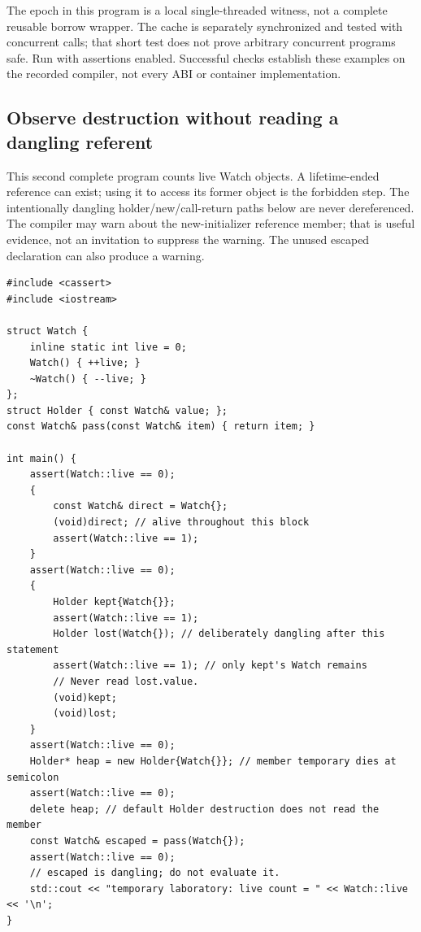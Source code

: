 The epoch in this program is a local single-threaded witness, not a complete reusable borrow wrapper. The cache is separately synchronized and tested with concurrent calls; that short test does not prove arbitrary concurrent programs safe. Run with assertions enabled. Successful checks establish these examples on the recorded compiler, not every ABI or container implementation.

\subsection{Observe destruction without reading a dangling referent}\label{05-engine-i-ch004-observe-destruction-without-reading-a-dangling-referent}

This second complete program counts live Watch objects. A lifetime-ended reference can exist; using it to access its former object is the forbidden step. The intentionally dangling holder/new/call-return paths below are never dereferenced. The compiler may warn about the new-initializer reference member; that is useful evidence, not an invitation to suppress the warning. The unused escaped declaration can also produce a warning.

\begin{verbatim}
#include <cassert>
#include <iostream>

struct Watch {
    inline static int live = 0;
    Watch() { ++live; }
    ~Watch() { --live; }
};
struct Holder { const Watch& value; };
const Watch& pass(const Watch& item) { return item; }

int main() {
    assert(Watch::live == 0);
    {
        const Watch& direct = Watch{};
        (void)direct; // alive throughout this block
        assert(Watch::live == 1);
    }
    assert(Watch::live == 0);
    {
        Holder kept{Watch{}};
        assert(Watch::live == 1);
        Holder lost(Watch{}); // deliberately dangling after this statement
        assert(Watch::live == 1); // only kept's Watch remains
        // Never read lost.value.
        (void)kept;
        (void)lost;
    }
    assert(Watch::live == 0);
    Holder* heap = new Holder{Watch{}}; // member temporary dies at semicolon
    assert(Watch::live == 0);
    delete heap; // default Holder destruction does not read the member
    const Watch& escaped = pass(Watch{});
    assert(Watch::live == 0);
    // escaped is dangling; do not evaluate it.
    std::cout << "temporary laboratory: live count = " << Watch::live << '\n';
}
\end{verbatim}

